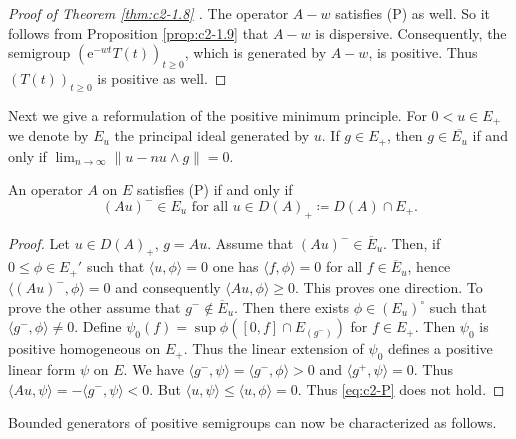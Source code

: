 \begin{proof}[Proof of Theorem \ref{thm:c2-1.8}  ]
%
The operator $A - w$ satisfies (P) 
as well.
So it follows from Proposition \ref{prop:c2-1.9}   that $A - w$ is dispersive.
Consequently, the semigroup $(\mathrm{e}^{-wt}T(t))_{t \geq 0}$, which is generated by $A - w$, is positive.
Thus $(T(t))_{t \geq 0}$ is positive as well.
\end{proof}
Next we give a reformulation of the positive minimum principle.
For $0 < u \in E_{+}$ we denote by $E_{u}$ the principal ideal generated by $u$.
If $g \in E_{+}$, then $g \in \overline{E_{u}}$ if and only if $\lim_{n \to \infty} \|u - n u \wedge g\| = 0$.
\begin{lemma}\label{lem:c2-1.10}
%
%
An operator $A$ on $E$ satisfies (P) if and only if
\begin{equation}\label{eq:c2-1.8}
(Au)^{-} \in E_{u} \text{ for all } u \in D(A)_{+} \coloneqq D(A) \cap E_{+}.
\end{equation}
\end{lemma}
\begin{proof}
Let $u \in D(A)_{+}$, $g = Au$.
Assume that $(Au)^{-} \in \overline{E}_{u}$.
Then, if $0 \leq \phi \in E_{+}'$ such that $\langle u,\phi \rangle = 0$ one has $\langle f,\phi \rangle = 0$ for all $f \in \overline{E}_{u}$, hence $\langle (Au)^{-},\phi \rangle = 0$ and consequently $\langle Au,\phi \rangle \geq 0$.
This proves one direction.
To prove the other assume that $g^{-} \not\in \overline{E}_{u}$.
Then there exists $\phi \in (E_{u})^{\circ}$ such that $\langle g^{-},\phi \rangle \not= 0$.
Define $\psi_{0}(f) = \sup \phi([0,f] \cap E_{(g^{-})})$ for $f \in E_{+}$.
Then $\psi_{0}$ is positive homogeneous on $E_{+}$.
Thus the linear extension of $\psi_{0}$ defines a positive linear form $\psi$ on $E$.
We have $\langle g^{-},\psi \rangle = \langle g^{-},\phi \rangle > 0$ and $\langle g^{+},\psi \rangle = 0$.
Thus $\langle Au,\psi \rangle = - \langle g^{-},\psi \rangle < 0$.
But $\langle u,\psi \rangle \leq \langle u,\phi \rangle = 0$.
Thus  \eqref{eq:c2-P}   does not hold.
\end{proof}
Bounded generators of positive semigroups can now be characterized as follows.
